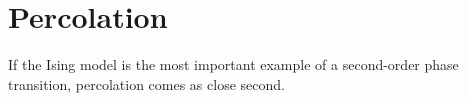 \chapter{Percolation}
\label{ch:perc}

If the Ising model is the most important example of a second-order
phase transition, percolation comes as close second.
